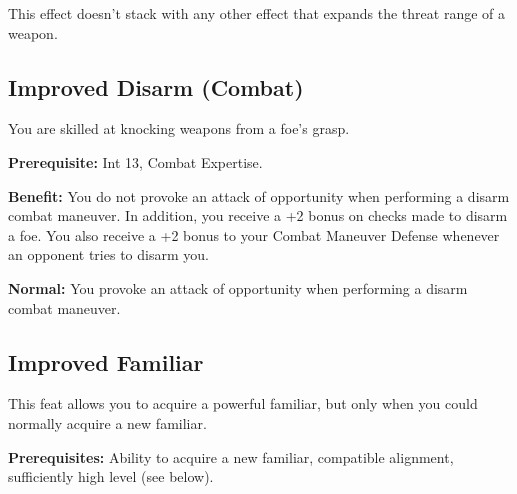 This effect doesn't stack with any other effect that expands the threat range of a weapon.
				
\subsection{Improved Disarm (Combat)}

				
You are skilled at knocking weapons from a foe's grasp.
				
\textbf{Prerequisite:} Int 13, Combat Expertise.
				
\textbf{Benefit:} You do not provoke an attack of opportunity when performing a disarm combat maneuver. In addition, you receive a +2 bonus on checks made to disarm a foe. You also receive a +2 bonus to your Combat Maneuver Defense whenever an opponent tries to disarm you.
				
\textbf{Normal:} You provoke an attack of opportunity when performing a disarm combat maneuver.
				
\subsection{Improved Familiar}

				
This feat allows you to acquire a powerful familiar, but only when you could normally acquire a new familiar.
				
\textbf{Prerequisites:} Ability to acquire a new familiar, compatible alignment, sufficiently high level (see below).
				
